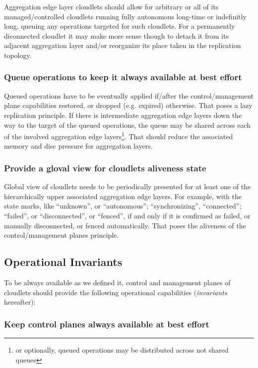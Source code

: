 \documentclass[conference]{IEEEtran}
\begin{document}
Aggregation edge layer cloudlets should allow for arbitrary or all of
its managed/controlled cloudlets running fully autonomous long-time or
indefinitly long, queuing any operations targeted for such cloudlets.
For a permanently diconnected cloudlet it may make more sense though to
detach it from its adjacent aggregation layer and/or reorganize its place
taken in the replication topology.

\subsubsection{Queue operations to keep it always available at best
effort}

Queued operations have to be eventually applied if/after the control/management
plane capabilities restored, or dropped (e.g. expired) otherwise. That poses a
lazy replication principle. If there is intermediate aggregation edge layers
down the way to the target of the queued operations, the queue may be shared
across each of the involved aggregation edge layers\footnote{or optionally,
queued operations may be distributed across not shared queues}. That should
reduce the associated memory and disc pressure for aggregation layers.

\subsubsection{Provide a gloval view for cloudlets aliveness state}

Global view of cloudlets needs to be periodically presented for at least one of
the hierarchically upper associated aggregation edge layers. For example, with
the state marks, like ``unknown'', or ``autonomous''; ``synchronizing'',
``connected''; ``failed'', or ``disconnected'', or ``fenced'', if and only if
it is confirmed as failed, or manually disconnected, or fenced automatically.
That poses the aliveness of the control/management planes principle.

\subsection{Operational Invariants}

To be always available as we defined it, control and management planes of
cloudlets should provide the following operational capabilities
(\textit{invariants} hereafter):

\subsubsection{Keep control planes always available at best effort}
\end{document}
